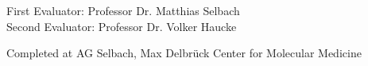 \documentclass[
12pt, %
english, %
onehalfspacing, %
headsepline, %
]{MastersDoctoralThesis} %
\begin{document}
\begin{titlepage}
\begin{center}
\vspace*{1cm}
\end{center}
\begin{flushleft}
\large\normalfont First Evaluator: Professor Dr. Matthias Selbach\\
Second Evaluator: Professor Dr. Volker Haucke\\

\vspace*{1cm}

Completed at AG Selbach, Max Delbr\"{u}ck Center for Molecular Medicine
\end{flushleft}

 
\vfill
\end{titlepage}
\end{document}
